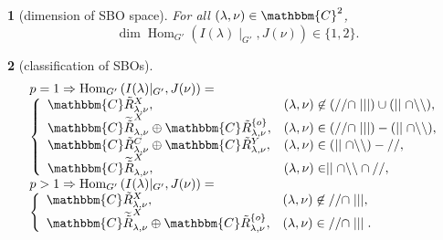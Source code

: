 \documentclass[notes,notheorems]{beamer}
\newcommand{\Hom}{\mbox{\normalfont Hom}}
\newcommand{\nin}{\not\in}
\newcommand{\tmop}[1]{\ensuremath{\operatorname{#1}}}
\newtheorem{theorem}{\translate{Theorem}}[section]
\newtheorem{theorem}{\translate{Theorem}}
\theoremstyle{definition}
\theoremstyle{example}
\theoremstyle{plain}
\theoremstyle{mystyle}
\begin{document}
\begin{frame}{}
	\begin{theorem}[dimension of SBO space]
		For all
$(\lambda, \nu) \in \mathbbm{C}^2$, 
\begin{equation*}
\dim \tmop{Hom}_{G'} (I (\lambda) \mid_{G'}, J
(\nu)) \in \{ 1, 2 \}.
\end{equation*}
	\end{theorem}
	\begin{theorem}[classification of SBOs]
		\begin{equation*}
			\begin{array}[]{l}
				p=1\Rightarrow \Hom_{G'}\left( I(\lambda)\kern-0.1cm\mid_{G'},J(\nu) \right)=\\
				\left\{  \begin{array}[]{ll}
  \mathbbm{C} \tilde{R}_{\lambda, \nu}^X, & (\lambda, \nu) \nin (/ / \cap \mid
  \mid \mid) \cup (\mid \mid \cap \backslash\backslash),\\
  \mathbbm{C} \widetilde{\tilde{R}}_{\lambda, \nu}^X \oplus \mathbbm{C}
  \tilde{R}_{\lambda, \nu}^{\{ o \}}, & (\lambda, \nu) \in (/ / \cap \mid \mid
  \mid) - (\mid \mid \cap \backslash\backslash),\\
  \mathbbm{C} \tilde{R}_{\lambda, \nu}^C \oplus \mathbbm{C}
  \tilde{R}^Y_{\lambda, \nu}, & (\lambda, \nu) \in (\mid \mid \cap
  \backslash\backslash) - / /,\\
  \mathbbm{C} \widetilde{\tilde{R}}_{\lambda, \nu}^X, & (\lambda, \nu) \in
  \mid \mid \cap \backslash\backslash \cap / /,
				\end{array}
					\right.\\
				p>1\Rightarrow \Hom_{G'}\left( I(\lambda)\kern-0.1cm\mid_{G'},J(\nu) \right)=\\
				\left\{  \begin{array}[]{ll}
  \mathbbm{C} \tilde{R}_{\lambda, \nu}^X, & (\lambda, \nu) \nin / / \cap \mid
  \mid \mid,\\
  \mathbbm{C} \widetilde{\tilde{R}}_{\lambda, \nu}^X \oplus \mathbbm{C}
  \tilde{R}_{\lambda, \nu}^{\{ o \}}, & (\lambda, \nu) \in / / \cap \mid \mid
  \mid.
				\end{array}
					\right.\\
			\end{array}
		\end{equation*}
	\end{theorem}
\end{frame}
\end{document}
